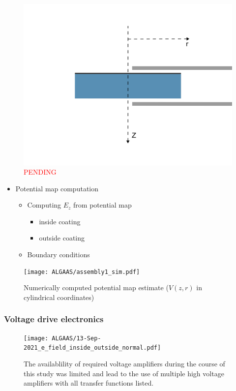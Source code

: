 \begin{figure}[H]
  \centering
  \includegraphics[width=.65\textwidth]{figs/ALGAAS/laplace_coord_test.pdf}
  \caption{\textcolor{red}{PENDING}}
  \label{fig:laplacecoords}
\end{figure}
\begin{itemize}
    \item Potential map computation 	
        \begin{itemize}
	    \item Computing $E_z$ from potential map
		\begin{itemize}
		    \item inside coating
		    \item outside coating
		\end{itemize}
	    \item Boundary conditions
	\end{itemize}
\end{itemize}

\begin{figure}[H]
  \texttt{[image: ALGAAS/assembly1\_sim.pdf]}
  \caption{Numerically computed potential map estimate ($V(z,r)$ in cylindrical coordinates)}
  \label{fig:poissoncalcoutput}
\end{figure}

\subsubsection{Voltage drive electronics}

\begin{figure}[H]
    \texttt{[image: ALGAAS/13-Sep-2021\_e\_field\_inside\_outside\_normal.pdf]}
    \caption{The availablility of required voltage amplifiers during the course of this study was limited and lead to the use of multiple high voltage amplifiers with all transfer functions listed.}
\label{fig:Ez}
\end{figure}


